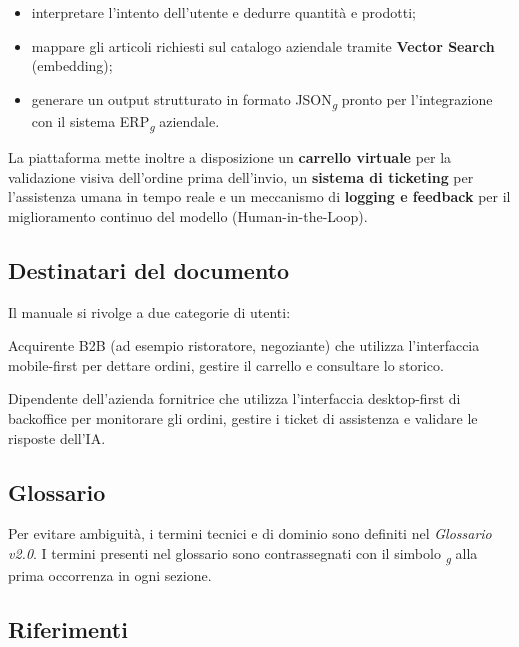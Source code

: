 \documentclass[a4paper, 11pt, oneside]{scrartcl}
\begin{document}
\begin{itemize}[noitemsep]
    \item interpretare l'intento dell'utente e dedurre quantit\`a e prodotti;
    \item mappare gli articoli richiesti sul catalogo aziendale tramite \textbf{Vector Search} (embedding);
    \item generare un output strutturato in formato JSON\textsubscript{\textit{g}} pronto per l'integrazione con il sistema ERP\textsubscript{\textit{g}} aziendale.
\end{itemize}

La piattaforma mette inoltre a disposizione un \textbf{carrello virtuale} per la validazione visiva dell'ordine prima dell'invio, un \textbf{sistema di ticketing} per l'assistenza umana in tempo reale e un meccanismo di \textbf{logging e feedback} per il miglioramento continuo del modello (Human-in-the-Loop).

\subsection{Destinatari del documento}
Il manuale si rivolge a due categorie di utenti:

\begin{description}[style=nextline]
    \item[\textbf{Cliente}] Acquirente B2B (ad esempio ristoratore, negoziante) che utilizza l'interfaccia mobile-first per dettare ordini, gestire il carrello e consultare lo storico.
    \item[\textbf{Operatore}] Dipendente dell'azienda fornitrice che utilizza l'interfaccia desktop-first di backoffice per monitorare gli ordini, gestire i ticket di assistenza e validare le risposte dell'IA.
\end{description}

\subsection{Glossario}
Per evitare ambiguit\`a, i termini tecnici e di dominio sono definiti nel \textit{Glossario v2.0}.
I termini presenti nel glossario sono contrassegnati con il simbolo \textsubscript{\textit{g}} alla prima occorrenza in ogni sezione.

\subsection{Riferimenti}
\end{document}
